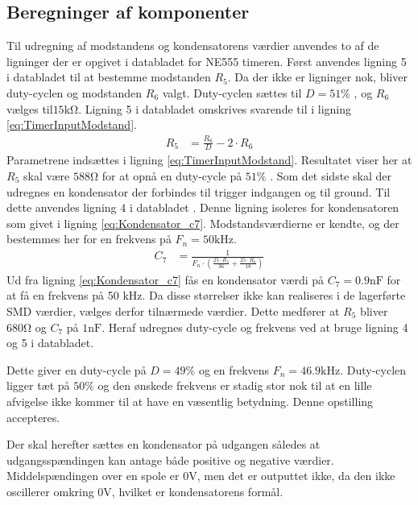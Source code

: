 \subsection{Beregninger af komponenter}
Til udregning af modstandens og kondensatorens værdier anvendes to af de ligninger der er opgivet i databladet for NE555 timeren. 
Først anvendes ligning 5 i databladet til at bestemme modstanden $R_5$. 
Da der ikke er ligninger nok, bliver duty-cyclen og modstanden $R_6$ valgt. 
Duty-cyclen sættes til $D = 51\%$  , og $R_6$ vælges til$ 15\si{\kilo\ohm}$. 
Ligning 5 \cite[Side 11.]{NE555} i databladet omskrives svarende til i ligning \ref{eq:TimerInputModstand}.
\begin{align}
R_5 & = \frac{R_6}{D} - 2 \cdot R_6 \label{eq:TimerInputModstand}
\end{align}
Parametrene indsættes i ligning \ref{eq:TimerInputModstand}.
Resultatet viser her at $R_5$ skal være $588\si{\ohm}$ for at opnå en duty-cycle på $51\%$ .
Som det sidste skal der udregnes en kondensator der forbindes til trigger indgangen og til ground. 
Til dette anvendes ligning 4 i databladet \cite[Side 11]{NE555}. Denne ligning isoleres for kondensatoren som givet i ligning \ref{eq:Kondensator_c7}.
Modstandsværdierne er kendte, og der bestemmes her for en frekvens på $F_n = 50 \si{\kilo\hertz}$.
\begin{align}
	C_7 & = \frac{1}{F_n \cdot \left( \frac{25 \cdot R_5 }{36} + \frac{25 \cdot R_6}{18} \right) \label{eq:Kondensator_c7}}
\end{align}
Ud fra ligning \ref{eq:Kondensator_c7} fås en kondensator værdi på $C_7 = 0.9\si{\nano\farad}$ for at få en frekvens på 50 \si{\kilo\hertz}. 
Da disse størrelser ikke kan realiseres i de lagerførte SMD værdier, vælges derfor tilnærmede værdier. 
Dette medfører at $R_5$ bliver $680\si{\ohm}$ og $C_7$ på $1\si{\nano\farad}$. 
Heraf udregnes duty-cycle og frekvens ved at bruge ligning 4 og 5 i databladet. \cite[Side 11.]{NE555}

Dette giver en duty-cycle på $D = 49\%$ og en frekvens $F_n = 46.9\si{\kilo\hertz}$. 
Duty-cyclen ligger tæt på $50\%$ og den ønskede frekvens er stadig stor nok til at en lille afvigelse ikke kommer til at have en væsentlig betydning. Denne opstilling accepteres.

Der skal herefter sættes en kondensator på udgangen således at udgangsspændingen kan antage både positive og negative værdier. 
Middelspændingen over en spole er $0\si{\volt}$, men det er outputtet ikke, da den ikke oscillerer omkring $0 \si{\volt}$, hvilket er kondensatorens formål. 
